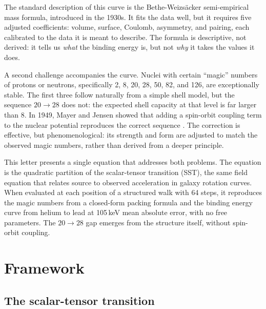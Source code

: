 \documentclass[fleqn,usenatbib]{mnras}
\begin{document}
The standard description of this curve is the Bethe-Weizs\"acker semi-empirical mass formula, introduced in the 1930s. It fits the data well, but it requires five adjusted coefficients: volume, surface, Coulomb, asymmetry, and pairing, each calibrated to the data it is meant to describe. The formula is descriptive, not derived: it tells us \emph{what} the binding energy is, but not \emph{why} it takes the values it does.

A second challenge accompanies the curve. Nuclei with certain ``magic'' numbers of protons or neutrons, specifically 2, 8, 20, 28, 50, 82, and 126, are exceptionally stable. The first three follow naturally from a simple shell model, but the sequence $20\!\to\!28$ does not: the expected shell capacity at that level is far larger than 8. In 1949, Mayer and Jensen showed that adding a spin-orbit coupling term to the nuclear potential reproduces the correct sequence \citep{Mayer1949}. The correction is effective, but phenomenological: its strength and form are adjusted to match the observed magic numbers, rather than derived from a deeper principle.

This letter presents a single equation that addresses both problems. The equation is the quadratic partition of the scalar-tensor transition (SST), the same field equation that relates source to observed acceleration in galaxy rotation curves. When evaluated at each position of a structured walk with 64 steps, it reproduces the magic numbers from a closed-form packing formula and the binding energy curve from helium to lead at 105\,keV mean absolute error, with no free parameters. The $20\!\to\!28$ gap emerges from the structure itself, without spin-orbit coupling.

\section{Framework}
\label{sec:framework}

\subsection{The scalar-tensor transition}
\label{sec:sst}
\end{document}
